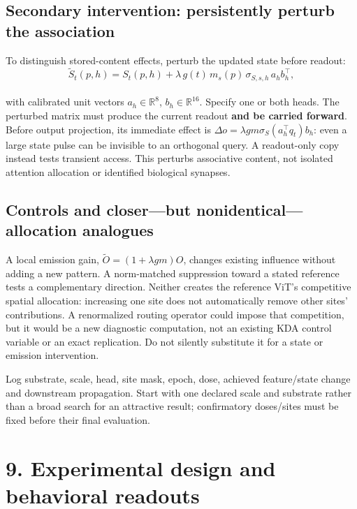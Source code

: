 \documentclass[
  10pt,
]{article}
\begin{document}
\subsection{Secondary intervention: persistently perturb the
association}\label{secondary-intervention-persistently-perturb-the-association}

To distinguish stored-content effects, perturb the updated state before
readout:\\
\[
\widetilde S_t(p,h)=S_t(p,h)
  +\lambda\,g(t)\,m_s(p)\,\sigma_{S,s,h}\,a_h b_h^\top,
\]\\
with calibrated unit vectors \(a_h\in\mathbb R^8\),
\(b_h\in\mathbb R^{16}\). Specify one or both heads. The perturbed
matrix must produce the current readout \textbf{and be carried forward}.
Before output projection, its immediate effect is
\(\Delta o=\lambda g m\sigma_S(a_h^\top q_t)b_h\): even a large state
pulse can be invisible to an orthogonal query. A readout-only copy
instead tests transient access. This perturbs associative content, not
isolated attention allocation or identified biological synapses.

\subsection{Controls and closer---but nonidentical---allocation
analogues}\label{controls-and-closerbut-nonidenticalallocation-analogues}

A local emission gain, \(\widetilde O=(1+\lambda g m)O\), changes
existing influence without adding a new pattern. A norm-matched
suppression toward a stated reference tests a complementary direction.
Neither creates the reference ViT's competitive spatial allocation:
increasing one site does not automatically remove other sites'
contributions. A renormalized routing operator could impose that
competition, but it would be a new diagnostic computation, not an
existing KDA control variable or an exact replication. Do not silently
substitute it for a state or emission intervention.

Log substrate, scale, head, site mask, epoch, dose, achieved
feature/state change and downstream propagation. Start with one declared
scale and substrate rather than a broad search for an attractive result;
confirmatory doses/sites must be fixed before their final evaluation.

\newpage

\section{9. Experimental design and behavioral
readouts}\label{experimental-design-and-behavioral-readouts}
\end{document}
